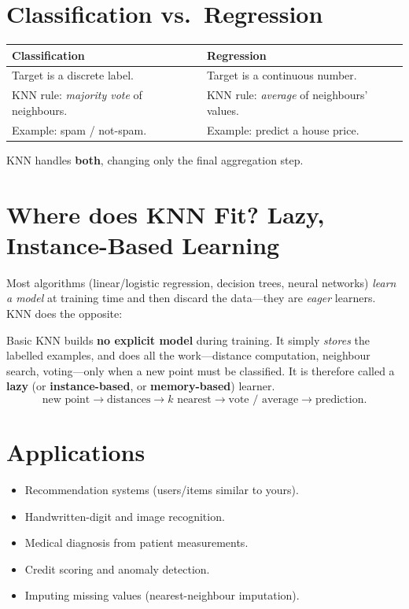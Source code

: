 \documentclass[11pt,a4paper]{report}
\theoremstyle{definition}
\theoremstyle{remark}
\begin{document}
	\section{Classification vs.\ Regression}
	\begin{center}
		\begin{tabular}{@{}p{6.4cm}p{6.4cm}@{}}
			\toprule
			\textbf{Classification} & \textbf{Regression}\\
			\midrule
			Target is a discrete label. & Target is a continuous number.\\
			KNN rule: \emph{majority vote} of neighbours. & KNN rule: \emph{average} of
			neighbours' values.\\
			Example: spam / not-spam. & Example: predict a house price.\\
			\bottomrule
		\end{tabular}
	\end{center}
	KNN handles \textbf{both}, changing only the final aggregation step.
	
	\section{Where does KNN Fit? Lazy, Instance-Based Learning}
	Most algorithms (linear/logistic regression, decision trees, neural networks)
	\emph{learn a model} at training time and then discard the data---they are
	\emph{eager} learners. KNN does the opposite:
	
	\begin{conceptbox}
		Basic KNN builds \textbf{no explicit model} during training. It simply
		\emph{stores} the labelled examples, and does all the work---distance
		computation, neighbour search, voting---only when a new point must be
		classified. It is therefore called a \textbf{lazy} (or \textbf{instance-based},
		or \textbf{memory-based}) learner.
		\[
		\text{new point}\rightarrow\text{distances}\rightarrow\text{$k$ nearest}
		\rightarrow\text{vote / average}\rightarrow\text{prediction.}
		\]
	\end{conceptbox}
	
	\section{Applications}
	\begin{itemize}[nosep]
		\item Recommendation systems (users/items similar to yours).
		\item Handwritten-digit and image recognition.
		\item Medical diagnosis from patient measurements.
		\item Credit scoring and anomaly detection.
		\item Imputing missing values (nearest-neighbour imputation).
	\end{itemize}
	
\end{document}

